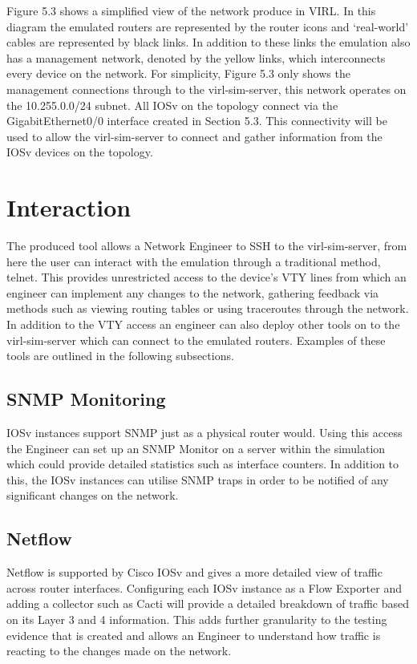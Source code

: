 \documentclass[11pt]{report}
\begin{document}
Figure 5.3 shows a simplified view of the network produce in VIRL. In this diagram the emulated routers are represented by the router icons and `real-world' cables are represented by black links. In addition to these links the emulation also has a management network, denoted by the yellow links, which interconnects every device on the network. For simplicity, Figure 5.3 only shows the management connections through to the virl-sim-server, this network operates on the 10.255.0.0/24 subnet. All IOSv on the topology connect via the GigabitEthernet0/0 interface created in Section 5.3. This connectivity will be used to allow the virl-sim-server to connect and gather information from the IOSv devices on the topology.

\section{Interaction}

The produced tool allows a Network Engineer to SSH to the virl-sim-server, from here the user can interact with the emulation through a traditional method, telnet. This provides unrestricted access to the device's VTY lines from which an engineer can implement any changes to the network, gathering feedback via methods such as viewing routing tables or using traceroutes through the network. In addition to the VTY access an engineer can also deploy other tools on to the virl-sim-server which can connect to the emulated routers. Examples of these tools are outlined in the following subsections.

\subsection{SNMP Monitoring}

IOSv instances support SNMP just as a physical router would. Using this access the Engineer can set up an SNMP Monitor on a server within the simulation which could provide detailed statistics such as interface counters. In addition to this, the IOSv instances can utilise SNMP traps in order to be notified of any significant changes on the network.

\subsection{Netflow}

Netflow is supported by Cisco IOSv and gives a more detailed view of traffic across router interfaces. Configuring each IOSv instance as a Flow Exporter and adding a collector such as Cacti will provide a detailed breakdown of traffic based on its Layer 3 and 4 information. This adds further granularity to the testing evidence that is created and allows an Engineer to understand how traffic is reacting to the changes made on the network.
\end{document}
